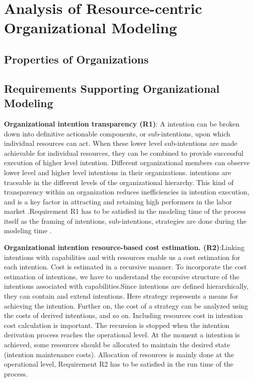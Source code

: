 \chapter{Analysis of Resource-centric Organizational Modeling}
\label{chap:analysis}

\section{Properties of Organizations}
\label{sec:propertiesorganization}


\section{Requirements Supporting Organizational Modeling}
\label{sec:requirementssupoorting}

\hspace{4ex} \textbf{Organizational intention transparency (R1)}:  A intention can be broken down into definitive actionable components, or sub-intentions, upon which individual resources can act. When these lower level sub-intentions are made  achievable for individual resources, they can be combined to provide successful execution of higher level intention. Different organizational members can observe lower level and higher level intentions in their organizations. intentions are traceable in the different levels of the organizational hierarchy. This kind of transparency within an organization reduces inefficiencies in intention execution, and is a key factor in attracting and retaining high  performers in the labor market \cite{McManus2007}.Requirement R1 has to be satisfied in the modeling time of the process itself as the framing of intentions, sub-intentions, strategies are done during the modeling time .

\hspace{4ex} \textbf{Organizational intention resource-based cost estimation. (R2)}:Linking intentions with capabilities and with resources enable us a cost estimation for each intention. Cost is estimated in a recursive manner. To incorporate the cost estimation of intentions, we have to understand the recursive structure of the intentions associated with capabilities.Since intentions are defined hierarchically, they can contain and extend intentions. Here strategy represents a means for achieving the intention. Further on, the cost of a strategy can be analyzed using the costs of derived  intentions, and so on. Including resources cost in intention cost calculation is important. The recursion is stopped when the intention derivation process reaches the operational
level. At the moment a  intention is achieved, some resources should be allocated to maintain the desired state (intention maintenance costs)\cite{Mandic2010}. Allocation of resources is mainly done at the operational level, Requirement R2 has to be satisfied in the run time of the process.

